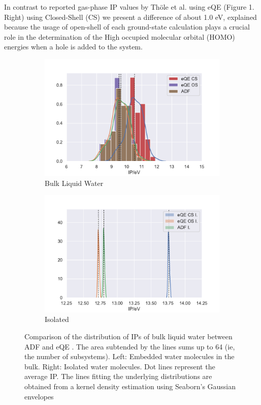 \documentclass[12pt,a4paper]{article}
\begin{document}
In contrast to reported gas-phase IP values by Th{\"o}le et al.\cite{tolle2019charged} using eQE (Figure 1. Right) using Closed-Shell (CS)
we present a difference of about 1.0 eV, explained because the usage of open-shell of each ground-state calculation plays a crucial role in the determination of the  High occupied molecular orbital (HOMO) energies when a hole is added to the system. \\

\begin{figure}[!ht]
        \captionsetup[subfigure]{labelformat=empty}
        \centering
        \begin{subfigure}{0.4\linewidth}
                \includegraphics[width=\linewidth]{bulk-eqe-adf}
                \caption{Bulk Liquid Water}
        \end{subfigure}
        \begin{subfigure}{0.4\linewidth}
                \includegraphics[width=\linewidth]{Iso-eqe-adf}
                \caption{Isolated}
        \end{subfigure}
        \caption{Comparison of the distribution of IPs of bulk liquid water between ADF\cite{te2001chemistry} and eQE \cite{genova2017eqe}. The area subtended by the lines sums up to 64 (ie, the number of subsystems). Left: Embedded water molecules in the bulk. Right: Isolated water molecules. Dot lines represent the average IP. The lines fitting the underlying distributions are obtained from a kernel density estimation using Seaborn's Gaussian envelopes\cite{waskom2017c}}
\end{figure}
\end{document}
